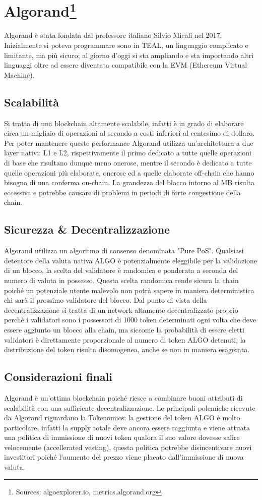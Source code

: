 \documentclass[a4paper, 12pt]{article}
\begin{document}
\section*{Algorand\footnote{Sources: algoexplorer.io, metrics.algorand.org}}
Algorand è stata fondata dal professore italiano Silvio Micali nel 2017. Inizialmente si poteva programmare sono in TEAL, un linguaggio complicato e limitante, ma più sicuro; al giorno d'oggi si sta ampliando e sta importando altri linguaggi oltre ad essere diventata compatibile con la EVM (Ethereum Virtual Machine).
\subsection*{Scalabilità}
Si tratta di una blockchain altamente scalabile, infatti è in grado di elaborare circa un migliaio di operazioni al secondo a costi inferiori al centesimo di dollaro. Per poter mantenere queste performance Algorand utilizza un'architettura a due layer nativi: L1 e L2, rispettivamente il primo dedicato a tutte quelle operazioni di base che risultano dunque meno onerose, mentre il secondo è dedicato a tutte quelle operazioni più elaborate, onerose ed a quelle elaborate off-chain che hanno bisogno di una conferma on-chain. La grandezza del blocco intorno al MB risulta eccessiva e potrebbe causare di problemi in periodi di forte congestione della chain.
\subsection*{Sicurezza \& Decentralizzazione}
Algorand utilizza un algoritmo di consenso denominata "Pure PoS". Qualsiasi detentore della valuta nativa ALGO è potenzialmente eleggibile per la validazione di un blocco, la scelta del validatore è randomica e  ponderata a seconda del numero di valuta in possesso. Questa scelta randomica rende sicura la chain poiché un potenziale utente malevolo non potrà sapere in maniera deterministica chi sarà il prossimo validatore del blocco.
Dal punto di vista della decentralizzazione si tratta di un network altamente decentralizzato proprio perchè i validatori sono i possessori di 1000 token determinati ogni volta che deve essere aggiunto un blocco alla chain, ma siccome la probabilità di essere eletti validatori è direttamente proporzionale al numero di token ALGO detenuti, la distribuzione del token risulta disomogenea, anche se non in maniera esagerata.
\subsection*{Considerazioni finali}
Algorand è un'ottima blockchain poiché riesce a combinare buoni attributi di scalabilità con una sufficiente decentralizzazione. Le principali polemiche ricevute da Algorand riguardano la Tokenomics: la gestione del token ALGO è molto particolare, infatti la supply totale deve ancora essere raggiunta e viene attuata una politica di immissione di nuovi token qualora il suo valore dovesse salire velocemente (accellerated vesting), questa politica potrebbe disincentivare nuovi investitori poiché l'aumento del prezzo viene placato dall'immissione di nuova valuta.
\end{document}
